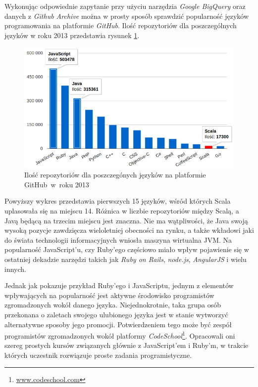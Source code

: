 \documentclass[wimgr]{xmgr}
\begin{document}
Wykonując odpowiednie zapytanie przy użyciu narzędzia \textit{Google BigQuery} oraz danych z \textit{Github Archive} można w prosty sposób sprawdzić popularność języków programowania na platformie \textit{GitHub}. Ilość repozytoriów dla poszczególnych języków w roku 2013  przedstawia rysunek \ref{RYS.1}. 

\begin{figure}[!tbh]
\centering 
\includegraphics[width=.95\hsize]{fig/top_github_languages_2013}
\caption{Ilość repozytoriów dla poszczegónych języków na platformie GitHub~w~roku 2013 \label{RYS.1}}
\end{figure}

Powyższy wykres przedstawia pierwszych 15 języków, wśród których Scala uplasowała się na miejscu 14. Różnica w liczbie repozytoriów między Scalą, a Javą będącą na trzecim miejscu jest znaczna. Nie ma wątpliwości, że Java swoją wysoką pozycje zawdzięcza wieloletniej obecności na rynku, a także wkładowi jaki do świata technologii informacyjnych wniosła maszyna wirtualna JVM. Na popularność JavaScript'u, czy Ruby'ego częściowo miało wpływ pojawienie się w ostatniej dekadzie narzędzi takich jak \textit{Ruby on Rails}, \textit{node.js}, \textit{AngularJS} i wielu innych. 

Jednak jak pokazuje przykład Ruby'ego i JavaScriptu, jednym z elementów wpływających na popularność jest aktywne środowisko programistów zgromadzonych wokół danego języka. Niejednokrotnie, taka grupa osób przekonana o zaletach swojego ulubionego języka jest w stanie wytworzyć alternatywne sposoby jego promocji. Potwierdzeniem tego może być zespół programistów zgromadzonych wokół platformy \textit{CodeSchool}\footnote{\url{www.codeschool.com}}. Opracowali oni szereg prostych kursów związanych głównie z JavaScript'em i Ruby'm, w trakcie których uczestnik rozwiązuje proste zadania programistyczne. 
\end{document}
